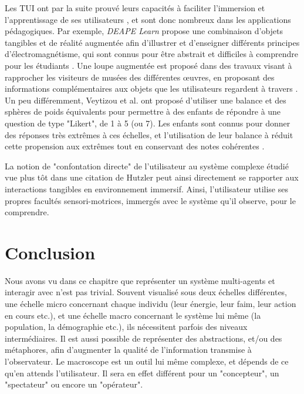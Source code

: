 			Les TUI ont par la suite prouvé leurs capacités à faciliter l'immersion et l'apprentissage de ses utilisateurs \cite{zuckerman_tui_2013, fleck_marker-based_2015, cheng_affordances_2013}, et sont donc nombreux dans les applications pédagogiques. Par exemple, \textit{DEAPE Learn} propose une combinaison d'objets tangibles et de réalité augmentée afin d'illustrer et d'enseigner différents principes d'électromagnétisme, qui sont connus pour être abstrait et difficiles à comprendre pour les étudiants \cite{da_costa_realite_2019}. Une loupe augmentée est proposé dans des travaux visant à rapprocher les visiteurs de musées des différentes œuvres, en proposant des informations complémentaires aux objets que les utilisateurs regardent à travers \cite{damala_loupe_2016}. Un peu différemment, Veytizou et al. ont proposé d'utiliser une balance et des sphères de poids équivalents pour permettre à des enfants de répondre à une question de type "Likert", de 1 à 5 (ou 7). Les enfants sont connus pour donner des réponses très extrêmes à ces échelles, et l'utilisation de leur balance à réduit cette propension aux extrêmes tout en conservant des notes cohérentes \cite{veytizou_could_2018}.
	
	La notion de "confontation directe" de l'utilisateur au système complexe étudié vue plus tôt dans une citation de Hutzler \cite{hutzler_du_2000} peut ainsi directement se rapporter aux interactions tangibles en environnement immersif. Ainsi, l'utilisateur utilise ses propres facultés sensori-motrices, immergés avec le système qu'il observe, pour le comprendre.
	
				
	\section*{Conclusion}
	
		Nous avons vu dans ce chapitre que représenter un système multi-agents et interagir avec n'est pas trivial. Souvent visualisé sous deux échelles différentes, une échelle micro concernant chaque individu (leur énergie, leur faim, leur action en cours etc.), et une échelle macro concernant le système lui même (la population, la démographie etc.), ils nécessitent parfois des niveaux intermédiaires. Il est aussi possible de représenter des abstractions, et/ou des métaphores, afin d'augmenter la qualité de l'information transmise à l'observateur. Le macroscope est un outil lui même complexe, et dépends de ce qu'en attends l'utilisateur. Il sera en effet différent pour un "concepteur", un "spectateur" ou encore un "opérateur".
		
